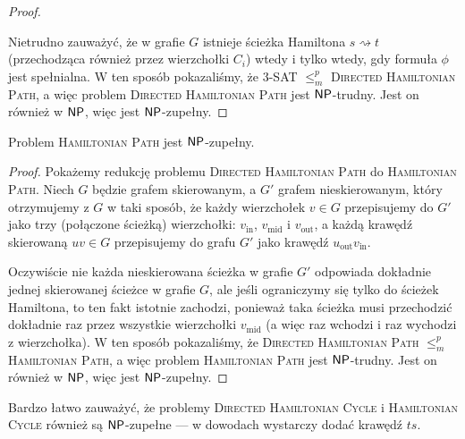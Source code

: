 \begin{proof}
\begin{enumerate}
\begin{figure}[H]
        \end{figure}
    \end{enumerate}

    Nietrudno zauważyć, że w grafie $G$ istnieje ścieżka Hamiltona $s \rightsquigarrow t$ (przechodząca również przez wierzchołki $C_i$) wtedy i tylko wtedy, gdy formuła $\phi$ jest spełnialna. W ten sposób pokazaliśmy, że 3-SAT $\leq_m^p$ \textsc{Directed Hamiltonian Path}, a więc problem \textsc{Directed Hamiltonian Path} jest $\textsf{NP}$-trudny. Jest on również w $\textsf{NP}$, więc jest $\textsf{NP}$-zupełny.
\end{proof}

\begin{theorem}\label{t:Hamiltonian Path}
    Problem \textsc{Hamiltonian Path} jest $\textsf{NP}$-zupełny.
\end{theorem}
\begin{proof}
    Pokażemy redukcję problemu \textsc{Directed Hamiltonian Path} do \textsc{Hamiltonian Path}. Niech $G$ będzie grafem skierowanym, a $G'$ grafem nieskierowanym, który otrzymujemy z $G$ w taki sposób, że każdy wierzchołek $v \in G$ przepisujemy do $G'$ jako trzy (połączone ścieżką) wierzchołki: $v_\text{in}$, $v_\text{mid}$ i $v_\text{out}$, a każdą krawędź skierowaną $uv \in G$ przepisujemy do grafu $G'$ jako krawędź $u_\text{out}v_\text{in}$.

    Oczywiście nie każda nieskierowana ścieżka w grafie $G'$ odpowiada dokładnie jednej skierowanej ścieżce w grafie $G$, ale jeśli ograniczymy się tylko do ścieżek Hamiltona, to ten fakt istotnie zachodzi, ponieważ taka ścieżka musi przechodzić dokładnie raz przez wszystkie wierzchołki $v_\text{mid}$ (a więc raz wchodzi i raz wychodzi z wierzchołka).
    W ten sposób pokazaliśmy, że \textsc{Directed Hamiltonian Path} $\leq_m^p$ \textsc{Hamiltonian Path}, a więc problem \textsc{Hamiltonian Path} jest $\textsf{NP}$-trudny. Jest on również w $\textsf{NP}$, więc jest $\textsf{NP}$-zupełny.
\end{proof}

Bardzo łatwo zauważyć, że problemy \textsc{Directed Hamiltonian Cycle} i \textsc{Hamiltonian Cycle} również są $\textsf{NP}$-zupełne --- w dowodach wystarczy dodać krawędź $ts$.

